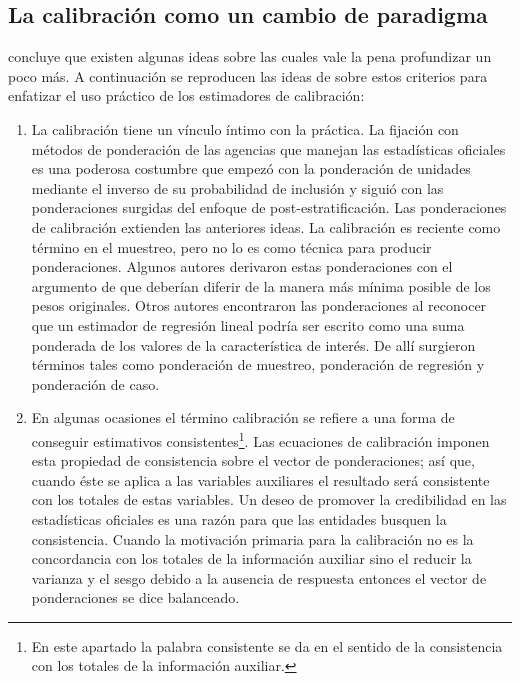 \documentclass[
  10pt,
  spanish,
]{book}
\begin{document}
\hypertarget{la-calibraciuxf3n-como-un-cambio-de-paradigma}{%
\subsection{La calibración como un cambio de paradigma}\label{la-calibraciuxf3n-como-un-cambio-de-paradigma}}

\citet{Sar08} concluye que existen algunas ideas sobre las cuales vale la pena profundizar un poco más. A continuación se reproducen las ideas de \citet{Gutierrez_2016} sobre estos criterios para enfatizar el uso práctico de los estimadores de calibración:

\begin{enumerate}
\def\labelenumi{\arabic{enumi}.}
\item
  La calibración tiene un vínculo íntimo con la práctica. La fijación con métodos de ponderación de las agencias que manejan las estadísticas oficiales es una poderosa costumbre que empezó con la ponderación de unidades mediante el inverso de su probabilidad de inclusión y siguió con las ponderaciones surgidas del enfoque de post-estratificación. Las ponderaciones de calibración extienden las anteriores ideas. La calibración es reciente como término en el muestreo, pero no lo es como técnica para producir ponderaciones. Algunos autores derivaron estas ponderaciones con el argumento de que deberían diferir de la manera más mínima posible de los pesos originales. Otros autores encontraron las ponderaciones al reconocer que un estimador de regresión lineal podría ser escrito como una suma ponderada de los valores de la característica de interés. De allí surgieron términos tales como ponderación de muestreo, ponderación de regresión y ponderación de caso.
\item
  En algunas ocasiones el término calibración se refiere a una forma de conseguir estimativos consistentes\footnote{En este apartado la palabra consistente se da en el sentido de la consistencia con los totales de la información auxiliar.}. Las ecuaciones de calibración imponen esta propiedad de consistencia sobre el vector de ponderaciones; así que, cuando éste se aplica a las variables auxiliares el resultado será consistente con los totales de estas variables. Un deseo de promover la credibilidad en las estadísticas oficiales es una razón para que las entidades busquen la consistencia. Cuando la motivación primaria para la calibración no es la concordancia con los totales de la información auxiliar sino el reducir la varianza y el sesgo debido a la ausencia de respuesta entonces el vector de ponderaciones se dice balanceado.

\end{enumerate}
\end{document}
